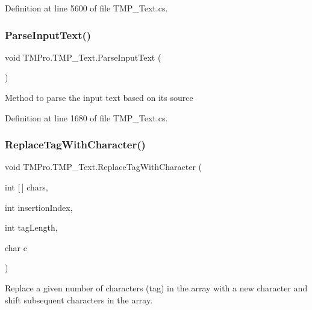 Definition at line 5600 of file T\+M\+P\+\_\+\+Text.\+cs.

\mbox{\label{class_t_m_pro_1_1_t_m_p___text_abf101b7be511178e9d0d6999dcd26977}} 
\subsubsection{\texorpdfstring{ParseInputText()}{ParseInputText()}}
{\footnotesize\ttfamily void T\+M\+Pro.\+T\+M\+P\+\_\+\+Text.\+Parse\+Input\+Text (\begin{DoxyParamCaption}{ }\end{DoxyParamCaption})\hspace{0.3cm}{\ttfamily [protected]}}



Method to parse the input text based on its source 



Definition at line 1680 of file T\+M\+P\+\_\+\+Text.\+cs.

\mbox{\label{class_t_m_pro_1_1_t_m_p___text_aff29421747c4ff78a5d345bf7f35cb88}} 
\subsubsection{\texorpdfstring{ReplaceTagWithCharacter()}{ReplaceTagWithCharacter()}}
{\footnotesize\ttfamily void T\+M\+Pro.\+T\+M\+P\+\_\+\+Text.\+Replace\+Tag\+With\+Character (\begin{DoxyParamCaption}\item[{int \mbox{[}$\,$\mbox{]}}]{chars,  }\item[{int}]{insertion\+Index,  }\item[{int}]{tag\+Length,  }\item[{char}]{c }\end{DoxyParamCaption})\hspace{0.3cm}{\ttfamily [protected]}}



Replace a given number of characters (tag) in the array with a new character and shift subsequent characters in the array. 


